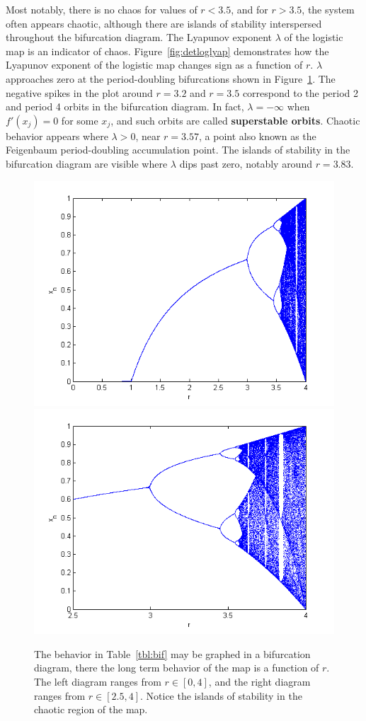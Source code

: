Most notably, there is no chaos for values of $r
< 3.5$, and for $r > 3.5$, the system often appears chaotic, although
there are islands of stability interspersed throughout the bifurcation
diagram. The Lyapunov exponent $\lambda$ of the logistic map is an indicator of
chaos. Figure~\ref{fig:detloglyap} demonstrates how the Lyapunov
exponent of the logistic map changes sign as a function of
$r$. $\lambda$ approaches zero at the period-doubling bifurcations
shown in Figure~\ref{fig:bif}. The negative spikes in the plot around
$r=3.2$ and $r=3.5$ correspond to the period 2 and period 4 orbits in the
bifurcation diagram. In fact, $\lambda = -\infty$ when $f'(x_j)=0$ for some $x_j$,
and such orbits are called \textbf{superstable orbits}. Chaotic behavior appears where $\lambda >0$, near
$r=3.57$, a point also known as the Feigenbaum period-doubling
accumulation point. The islands of stability in the bifurcation diagram are
visible where $\lambda$ dips past zero, notably around $r=3.83$.
\begin{figure}[!h]
\caption[Bifurcation diagram for the deterministic logistic map]{The
  behavior in Table~\ref{tbl:bif} may be graphed in a bifurcation
  diagram, there the long term behavior of the map is a function of $r$. The left diagram ranges from $r\in
  [0,4]$, and the right diagram ranges from $r\in [2.5,4]$. Notice the
  islands of stability in the chaotic region of the map.}\label{fig:bif}
\centering
\includegraphics[width=.5\textwidth]{figs/det_bif_1.png}\hfill
\includegraphics[width=.5\textwidth]{figs/det_bif_2.png}
\end{figure}
